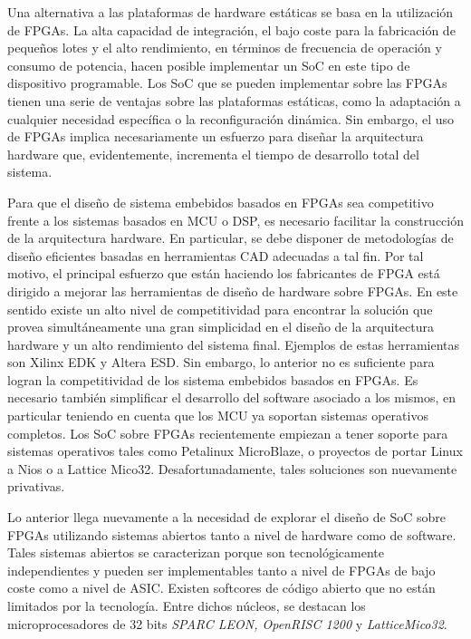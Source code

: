 Una alternativa a las plataformas de hardware estáticas se basa en la
utilización de FPGAs. La alta capacidad de integración, el bajo coste
para la fabricación de pequeños lotes y el alto rendimiento, en
términos de frecuencia de operación y consumo de potencia, hacen
posible implementar un SoC en este tipo de dispositivo
programable. Los SoC que se pueden implementar sobre las FPGAs tienen
una serie de ventajas sobre las plataformas estáticas, como la
adaptación a cualquier necesidad específica o la reconfiguración
dinámica. Sin embargo, el uso de FPGAs implica necesariamente un
esfuerzo para diseñar la arquitectura hardware que, evidentemente,
incrementa el tiempo de desarrollo total del sistema.

Para que el diseño de sistema embebidos basados en FPGAs sea
competitivo frente a los sistemas basados en MCU o DSP, es necesario
facilitar la construcción de la arquitectura hardware. En particular,
se debe disponer de metodologías de diseño eficientes basadas en
herramientas CAD adecuadas a tal fin. Por tal motivo, el principal
esfuerzo que están haciendo los fabricantes de FPGA está dirigido a
mejorar las herramientas de diseño %
de hardware sobre FPGAs. En este sentido
existe un alto nivel de competitividad para encontrar la solución que
provea simultáneamente una gran simplicidad en el diseño de la
arquitectura hardware y un alto rendimiento del sistema
final. Ejemplos de estas herramientas son Xilinx EDK y Altera ESD. Sin
embargo, lo anterior no es suficiente para logran la competitividad de
los sistema embebidos basados en FPGAs. Es necesario también
simplificar el desarrollo del software asociado a los mismos, en
particular teniendo en cuenta que los MCU ya soportan sistemas
operativos completos. Los SoC sobre FPGAs recientemente empiezan a
tener soporte para sistemas operativos tales como Petalinux
MicroBlaze, o proyectos de portar Linux a Nios o a Lattice
Mico32. Desafortunadamente, tales soluciones son nuevamente
privativas.

Lo anterior llega nuevamente a la necesidad de explorar el diseño de
SoC sobre FPGAs utilizando sistemas abiertos tanto a nivel de hardware
como de software. Tales sistemas abiertos se caracterizan porque son
tecnológicamente independientes y pueden ser implementables tanto a
nivel de FPGAs de bajo coste como a nivel de ASIC. Existen softcores
de código abierto que no están limitados por la tecnología. Entre
dichos núcleos, se destacan los microprocesadores de 32 bits
\textit{SPARC LEON, OpenRISC 1200} y \textit{LatticeMico32}.

